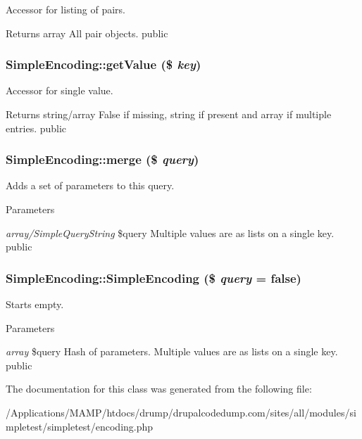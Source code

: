 \label{class_simple_encoding_a13d2399adeb9e4c0eb44865c1a36400b}
Accessor for listing of pairs. \begin{DoxyReturn}{Returns}
array All pair objects.  public 
\end{DoxyReturn}
\hypertarget{class_simple_encoding_ac66d3c34759e0bb892588c0cc7203b79}{
\subsubsection[{getValue}]{\setlength{\rightskip}{0pt plus 5cm}SimpleEncoding::getValue (\$ {\em key})}}
\label{class_simple_encoding_ac66d3c34759e0bb892588c0cc7203b79}
Accessor for single value. \begin{DoxyReturn}{Returns}
string/array False if missing, string if present and array if multiple entries.  public 
\end{DoxyReturn}
\hypertarget{class_simple_encoding_a31264780522b324c1020cfe4ba3fc65c}{
\subsubsection[{merge}]{\setlength{\rightskip}{0pt plus 5cm}SimpleEncoding::merge (\$ {\em query})}}
\label{class_simple_encoding_a31264780522b324c1020cfe4ba3fc65c}
Adds a set of parameters to this query. 
\begin{DoxyParams}{Parameters}
\item[{\em array/SimpleQueryString}]\$query Multiple values are as lists on a single key.  public \end{DoxyParams}
\hypertarget{class_simple_encoding_aa64e424ec343e84043886e83aacfcb91}{
\subsubsection[{SimpleEncoding}]{\setlength{\rightskip}{0pt plus 5cm}SimpleEncoding::SimpleEncoding (\$ {\em query} = {\ttfamily false})}}
\label{class_simple_encoding_aa64e424ec343e84043886e83aacfcb91}
Starts empty. 
\begin{DoxyParams}{Parameters}
\item[{\em array}]\$query Hash of parameters. Multiple values are as lists on a single key.  public \end{DoxyParams}


The documentation for this class was generated from the following file:\begin{DoxyCompactItemize}
\item 
/Applications/MAMP/htdocs/drump/drupalcodedump.com/sites/all/modules/simpletest/simpletest/encoding.php\end{DoxyCompactItemize}
